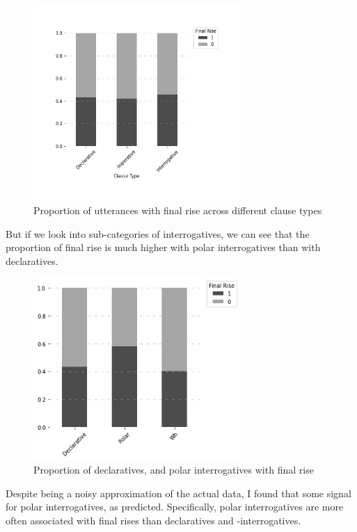 \begin{figure}[H]
    \centering
    \includegraphics[width=0.7\textwidth]{figures/rise-cl.jpg}
    \caption{Proportion of utterances with final rise across different clause types}
    \label{fig:rise-cl}
\end{figure}

But if we look into sub-categories of interrogatives, we can see that the proportion of final rise is much higher with polar interrogatives than with declaratives. 
\begin{figure}[H]
    \centering
    \includegraphics[width=0.7\textwidth]{figures/pitch-polardecwh.jpg}
    \caption{Proportion of declaratives, \twh{} and polar interrogatives with final rise}
    \label{fig:rise-int}
\end{figure}

Despite being a noisy approximation of the actual data, I found that some signal for polar interrogatives, as predicted. Specifically, polar interrogatives are more often associated with final rises than declaratives and \twh-interrogatives.

